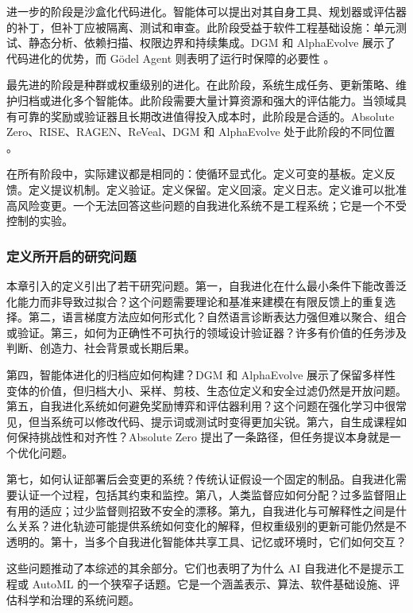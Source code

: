 进一步的阶段是沙盒化代码进化。智能体可以提出对其自身工具、规划器或评估器的补丁，但补丁应被隔离、测试和审查。此阶段受益于软件工程基础设施：单元测试、静态分析、依赖扫描、权限边界和持续集成。DGM 和 AlphaEvolve 展示了代码进化的优势，而 G{\"o}del Agent 则表明了运行时保障的必要性 \cite{darwingodelmachine2025,alphaevolve2025,yin2024godel}。

最先进的阶段是种群或权重级别的进化。在此阶段，系统生成任务、更新策略、维护归档或进化多个智能体。此阶段需要大量计算资源和强大的评估能力。当领域具有可靠的奖励或验证器且长期改进值得投入成本时，此阶段是合适的。Absolute Zero、RISE、RAGEN、ReVeal、DGM 和 AlphaEvolve 处于此阶段的不同位置 \cite{absolutezero2025,qu2024rise,wang2025ragen,reveal2025,darwingodelmachine2025,alphaevolve2025}。

在所有阶段中，实际建议都是相同的：使循环显式化。定义可变的基板。定义反馈。定义提议机制。定义验证。定义保留。定义回滚。定义日志。定义谁可以批准高风险变更。一个无法回答这些问题的自我进化系统不是工程系统；它是一个不受控制的实验。

\subsubsection{定义所开启的研究问题}

本章引入的定义引出了若干研究问题。第一，自我进化在什么最小条件下能改善泛化能力而非导致过拟合？这个问题需要理论和基准来建模在有限反馈上的重复选择。第二，语言梯度方法应如何形式化？自然语言诊断表达力强但难以聚合、组合或验证。第三，如何为正确性不可执行的领域设计验证器？许多有价值的任务涉及判断、创造力、社会背景或长期后果。

第四，智能体进化的归档应如何构建？DGM 和 AlphaEvolve 展示了保留多样性变体的价值，但归档大小、采样、剪枝、生态位定义和安全过滤仍然是开放问题。第五，自我进化系统如何避免奖励博弈和评估器利用？这个问题在强化学习中很常见，但当系统可以修改代码、提示词或测试时变得更加尖锐。第六，自生成课程如何保持挑战性和对齐性？Absolute Zero 提出了一条路径，但任务提议本身就是一个优化问题。

第七，如何认证部署后会变更的系统？传统认证假设一个固定的制品。自我进化需要认证一个过程，包括其约束和监控。第八，人类监督应如何分配？过多监督阻止有用的适应；过少监督则招致不安全的漂移。第九，自我进化与可解释性之间是什么关系？进化轨迹可能提供系统如何变化的解释，但权重级别的更新可能仍然是不透明的。第十，当多个自我进化智能体共享工具、记忆或环境时，它们如何交互？

这些问题推动了本综述的其余部分。它们也表明了为什么 AI 自我进化不是提示工程或 AutoML 的一个狭窄子话题。它是一个涵盖表示、算法、软件基础设施、评估科学和治理的系统问题。


